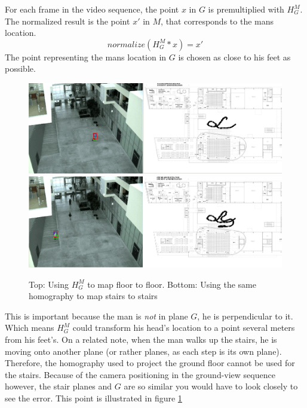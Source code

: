 For each frame in the video sequence, the point $x$ in $G$ is premultiplied
with $H_{G}^{M}$. The normalized result is the point $x'$ in $M$, that
corresponds to the mans location. $$normalize(H_{G}^{M}*x) = x'$$ The point
representing the mans location in $G$ is chosen as close to his feet as possible.
\begin{figure}[!htbp]
\includegraphics{./pics/trackFloor.png}
\includegraphics{./pics/trackStairs.png}
\caption{Top: Using $H_{G}^{M}$ to map floor to floor. Bottom: Using the same homography to map stairs to stairs}
\label{fig:floorvsstairs}
\end{figure}
This is important because the man is \emph{not} in plane $G$, he is
perpendicular to it. Which means $H_{G}^{M}$ could transform his head's
location to a point several meters from his feet's.  On a related note, when
the man walks up the stairs, he is moving onto another plane (or rather planes,
as each step is its own plane). Therefore, the homography used to project the
ground floor cannot be used for the stairs.  Because of the camera positioning
in the ground-view sequence however, the stair planes and $G$ are so similar
you would have to look closely to see the error. This point is illustrated in
figure \ref{fig:floorvsstairs}

